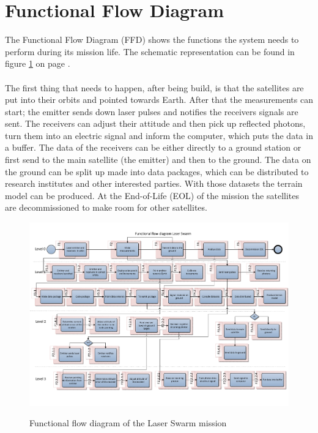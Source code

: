 \section{Functional Flow Diagram}
\label{section_FFD}
The Functional Flow Diagram (FFD) shows the functions the system needs to perform during its mission life. The schematic representation can be found in figure \ref{pic_FFD} on page \pageref{pic_FFD}.
\\ \\
The first thing that needs to happen, after being build, is that the satellites are put into their orbits and pointed towards Earth. After that the measurements can start; the emitter sends down laser pulses and notifies the receivers signals are sent. The receivers can adjust their attitude and then pick up reflected photons, turn them into an electric signal and inform the computer, which puts the data in a buffer. The data of the receivers can be either directly to a ground station or first send to the main satellite (the emitter) and then to the ground. The data on the ground can be split up made into data packages, which can be distributed to research institutes and other interested parties. With those datasets the terrain model can be produced. At the End-of-Life (EOL) of the mission the satellites are decommissioned to make room for other satellites.

\begin{figure}
\includegraphics[scale=0.7, angle=90]{img/pic_FFD.pdf}
\label{pic_FFD}
\caption{Functional flow diagram of the Laser Swarm mission}
\end{figure}

